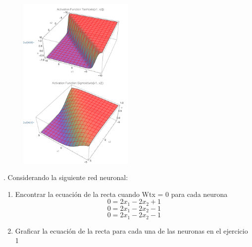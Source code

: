 \documentclass{article}
\begin{document}
\begin{flushleft}
\begin{enumerate}
\begin{figure}[H]
      \includegraphics[width=0.5\textwidth]{3_d.PNG}  %
    \end{figure}
    \end{enumerate}

. Considerando la siguiente red neuronal:
\begin{enumerate}
  \item
   Encontrar la ecuación de la recta cuando Wtx = 0 para cada neurona
   \[ 0 =   2x_1   - 2x_2  + 1 \]
   \[ 0 =   2x_1 - 2x_2 - 1 \]
   \[ 0 =   2x_1 - 2x_2 - 1 \]
  \item Graficar la ecuación de la recta para cada una de las neuronas en el ejercicio 1 


\end{enumerate}
\end{flushleft}
\end{document}
